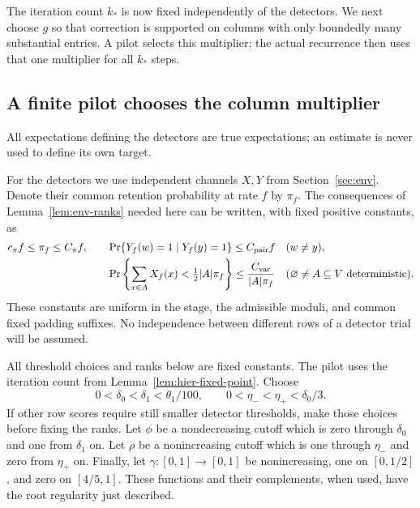 The iteration count $k_*$ is now fixed independently of the detectors.
We next choose $g$ so that correction is supported on columns with only
boundedly many substantial entries.  A pilot selects this multiplier;
the actual recurrence then uses that one multiplier for all $k_*$ steps.

\subsection{A finite pilot chooses the column multiplier}

All expectations defining the detectors are true expectations; an
estimate is never used to define its own target.

For the detectors we use independent channels $X,Y$ from
Section~\ref{sec:env}.  Denote their common retention probability at rate
$f$ by $\pi_f$.  The consequences of Lemma~\ref{lem:env-ranks} needed here
can be written, with fixed positive constants, as
\begin{align}
 c_\pi f\leq\pi_f\leq C_\pi f,\qquad
 &\Pr\{Y_f(w)=1\mid Y_f(y)=1\}\leq C_{\rm pair} f
       &&(w\ne y), \label{eq:hier-sampling-pair}\\
 &\Pr\left\{\sum_{x\in A}X_f(x)<\tfrac12|A|\pi_f\right\}
       \leq\frac{C_{\rm var}}{|A|\pi_f}
       &&(\varnothing\ne A\subseteq V\text{ deterministic}).
       \label{eq:hier-sampling-tail}
\end{align}
These constants are uniform in the stage, the admissible moduli, and common
fixed padding suffixes.  No independence between different rows of a
detector trial will be assumed.

All threshold choices and ranks below are fixed constants.  The pilot
uses the iteration count from Lemma~\ref{lem:hier-fixed-point}.  Choose
\[
 0<\delta_0<\delta_1<\theta_1/100,
 \qquad 0<\eta_-<\eta_+<\delta_0/3.
\]
If other row scores require still smaller detector thresholds, make those
choices before fixing the ranks.  Let $\phi$ be a nondecreasing cutoff
which is zero through $\delta_0$ and one from $\delta_1$ on.  Let $\rho$
be a nonincreasing cutoff which is one through $\eta_-$ and zero from
$\eta_+$ on.  Finally, let $\gamma:[0,1]\to[0,1]$ be nonincreasing,
one on $[0,1/2]$, and zero on $[4/5,1]$.  These functions and their
complements, when used, have the root regularity just described.

